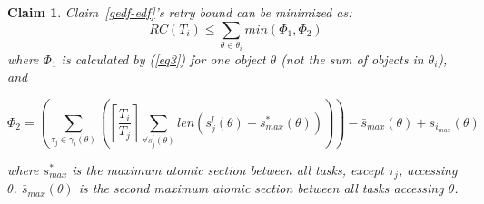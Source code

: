 \documentclass[12pt,english]{report}
\newtheorem{clm}{Claim}
\begin{document}
\begin{clm}\label{clm:min_gedf-edf}
Claim~\ref{gedf-edf}'s retry bound can be minimized as:
\begin{equation}
RC(T_{i})\le \sum_{\theta\in\theta_{i}}min(\Phi_1 , \Phi_2)\label{eq5}\end{equation}
where $\Phi_1$ is calculated by (\ref{eq3}) for one object $\theta$ (not the sum of objects in $\theta_i$),  and 
 
\begin{equation}
\Phi_2 = \left(\sum_{\tau_{j}\in\gamma_i(\theta)} \left(\left\lceil\frac{T_{i}}{T_{j}}\right\rceil\sum_{\forall s_{j}^{l}(\theta)}len \left(s_{j}^{l}(\theta) + s_{max}^{*}(\theta) \right) \right) \right)-\bar{s}_{max}(\theta)+s_{i_{max}}(\theta)\label{eq4}\end{equation}
 
 
 where $s^*_{max}$ is the maximum atomic section between all tasks, except $\tau_j$, accessing $\theta$. $\bar{s}_{max}(\theta)$ is the second maximum atomic section between all tasks accessing $\theta$.
\end{clm}
\end{document}
